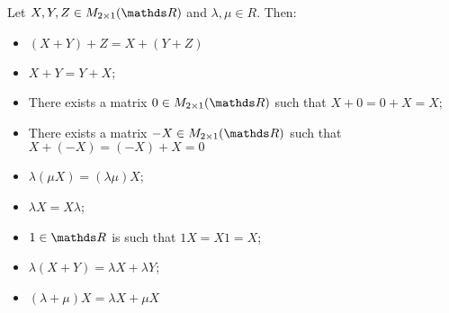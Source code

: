 \begin{lemma}
	Let $X,Y,Z\in M_{2\times1}(\R)$ and $\lambda,\mu\in R$. Then:
		\begin{itemize}
			\item $(X+Y)+Z=X+(Y+Z)$
			\item $X+Y=Y+X$;
			\item There exists a matrix $0\in M_{2\times 1}(\R)$ such that $X+0=0+X=X$;
			\item There exists a matrix $-X\in M_{2\times 1}(\R)$ such that $X+(-X)=(-X)+X=0$
			\item $\lambda(\mu X)=(\lambda \mu)X$;
			\item $\lambda X=X\lambda$;
			\item $1\in \R$ is such that $1X=X1=X$;
			\item $\lambda(X+Y)=\lambda X+\lambda Y$;
			\item $(\lambda+\mu)X=\lambda X+\mu X$
		\end{itemize}
\end{lemma}
